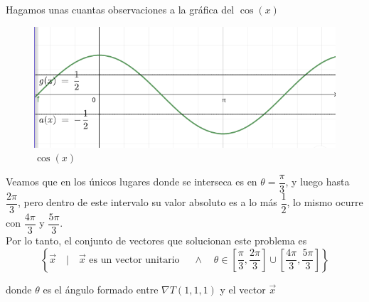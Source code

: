 \documentclass[letterpaper]{article}
\renewcommand{\*}{\cdot}
\theoremstyle{definition}
\begin{document}
Hagamos unas cuantas observaciones a la gráfica del $ \cos(x) $
\begin{figure}[h!]
	\centering
	\includegraphics[width=0.4\linewidth]{img/cosine.png}
	\caption{$ \cos(x) $}
\end{figure}
Veamos que en los únicos lugares donde se interseca es en $ \theta = \dfrac{\pi}{3} $, y luego hasta $ \dfrac{2\pi}{3} $, pero dentro de este intervalo su valor absoluto es a lo más $ \dfrac{1}{2} $, lo mismo ocurre con $ \dfrac{4\pi}{3} $ y $ \dfrac{5\pi}{3}  $.\\

Por lo tanto, el conjunto de vectores que solucionan este problema es 
\[ \left\lbrace \vec{x} \quad | \quad \vec{x} \text{ es un vector unitario } \quad \land \quad \theta \in \left[ \dfrac{\pi}{3}, \dfrac{2\pi}{3} \right] \cup \left[ \dfrac{4\pi}{3}, \dfrac{5\pi}{3} \right]  \right\rbrace \]

donde $ \theta $ es el ángulo formado entre $ \nabla T(1,1,1) $ y el vector $ \vec{x} $
\end{document}
